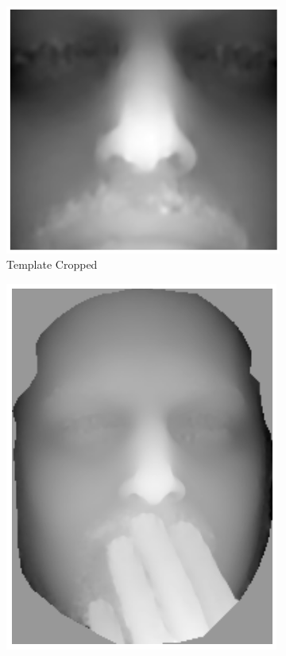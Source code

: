 \begin{figure}[t]
\begin{subfigure}[b]{0.3\textwidth}
    	\includegraphics[width=\textwidth]{statistical_normals/images/lk2d/bs004_template_cropped.png}
    	\caption{Template Cropped}\label{subfig:singl_img_depth_2d_lk_template_cropped}
    \end{subfigure} \hfill
    \begin{subfigure}[b]{0.3\textwidth}
    	\includegraphics[width=\textwidth]{statistical_normals/images/lk2d/bs004_occluded.png}

\end{subfigure}
\end{figure}
